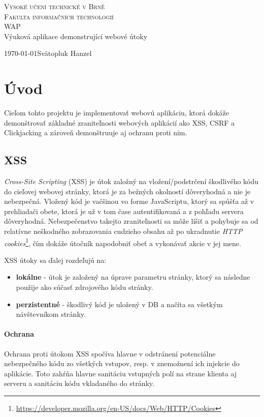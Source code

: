 \documentclass[12pt,a4paper]{article}
\begin{document}
\begin{titlepage}
	\begin{center}
	    {\LARGE\textsc{Vysoké  učení technické v Brně}}\\
	    \smallskip
	    {\Large\textsc{Fakulta informačních technologií}}\\
	    \bigskip
	    \smallskip
		\Huge{WAP}\\
		\huge{Výuková aplikace demonstrující webové útoky}
	\end{center}
    {\today \hfill Svätopluk Hanzel}
\end{titlepage}

\newpage
\section{Úvod}
	Cieľom tohto projektu je implementovať webovú aplikáciu, ktorá dokáže demonštrovať základné zraniteľnosti webových aplikácií ako XSS, CSRF a Clickjacking a zároveň demonštruuje aj ochranu proti nim.

	\subsection{XSS}
		\textit{Cross-Site Scripting} (XSS) je útok založný na vložení/podstrčení škodlivého kódu do cieľovej webovej stránky, ktorá je za bežných okolností dôveryhodná a nie je nebezpečná. Vložený kód je vačšinou vo forme JavaScriptu, ktorý sa spúšťa až v prehliadači obete, ktorá je už v tom čase autentifikovaná a z pohľadu servera dôveryhodná. Nebezpečenstvo takejto zraniteľnosti sa môže líšiť a pohybuje sa od relatívne neškodného zobrazovania cudzieho obsahu až po ukradnutie \textit{HTTP cookies}\footnote{\url{https://developer.mozilla.org/en-US/docs/Web/HTTP/Cookies}}, čím dokáže útočník napodobniť obeť a vykonávať akcie v jej mene.
		
		XSS útoky sa ďalej rozdeľujú na:
		\begin{itemize}
			\item \textbf{lokálne} - útok je založený na úprave parametru stránky, ktorý sa následne použije ako súčasť zdrojového kódu stránky.
			\item \textbf{perzistentné} - škodlivý kód je uložený v DB a načíta sa všetkým návštevníkom stránky.
		\end{itemize}
	
		\paragraph{Ochrana} Ochrana proti útokom XSS spočíva hlavne v odstránení potenciálne nebezpečného kódu zo všetkých vstupov, resp. v znemožnení ich injekcie do aplikácie. Toto zahŕňa hlavne sanitáciu vstupných polí na strane klienta aj serveru a sanitáciu kódu vkladaného do stránky.
		
\end{document}
